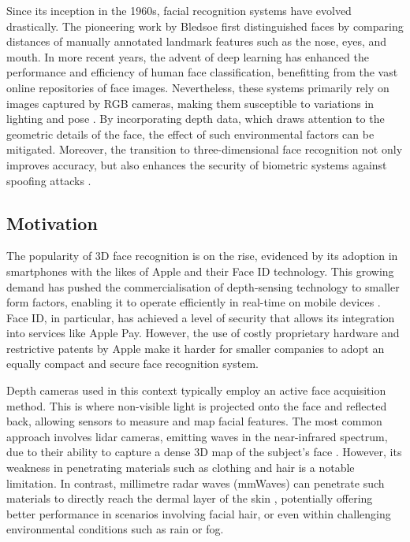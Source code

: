 \documentclass{mpaper}
\begin{document}
Since its inception in the 1960s, facial recognition systems have evolved drastically. The pioneering work by Bledsoe \cite{bledsoe1966model} first distinguished faces by comparing distances of manually annotated landmark features such as the nose, eyes, and mouth. In more recent years, the advent of deep learning has enhanced the performance and efficiency of human face classification, benefitting from the vast online repositories of face images.  Nevertheless, these systems primarily rely on images captured by RGB cameras, making them susceptible to variations in lighting and pose \cite{xu2004depth}. By incorporating depth data, which draws attention to the geometric details of the face, the effect of such environmental factors can be mitigated. Moreover, the transition to three-dimensional face recognition not only improves accuracy, but also enhances the security of biometric systems against spoofing attacks \cite{wen2015face}.



\subsection{Motivation}
The popularity of 3D face recognition is on the rise, evidenced by its adoption in smartphones with the likes of Apple and their Face ID \cite{apple-faceid} technology. This growing demand has pushed the commercialisation of depth-sensing technology to smaller form factors, enabling it to operate efficiently in real-time on mobile devices \cite{soumya2023recent}. Face ID, in particular, has achieved a level of security that allows its integration into services like Apple Pay. However, the use of costly proprietary hardware and restrictive patents by Apple make it harder for smaller companies to adopt an equally compact and secure face recognition system.

Depth cameras used in this context typically employ an active face acquisition method. This is where non-visible light is projected onto the face and reflected back, allowing sensors to measure and map facial features. The most common approach involves lidar cameras, emitting waves in the near-infrared spectrum, due to their ability to capture a dense 3D map of the subject's face \cite{wang2020evolution}. However, its weakness in penetrating materials such as clothing and hair is a notable limitation. In contrast, millimetre radar waves (mmWaves) can penetrate such materials to directly reach the dermal layer of the skin \cite{vizard2006advances}, potentially offering better performance in scenarios involving facial hair, or even within challenging environmental conditions such as rain or fog.
\end{document}
